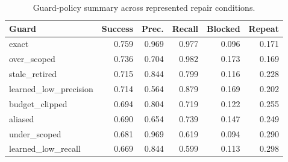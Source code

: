 \begin{table}[t]
\centering
\caption{Guard-policy summary across represented repair conditions.}
\label{tab:guard-summary}
\small
\begin{tabular}{lrrrrr}
\toprule
Guard & Success & Prec. & Recall & Blocked & Repeat \\
\midrule
exact & 0.759 & 0.969 & 0.977 & 0.096 & 0.171 \\
over\_scoped & 0.736 & 0.704 & 0.982 & 0.173 & 0.169 \\
stale\_retired & 0.715 & 0.844 & 0.799 & 0.116 & 0.228 \\
learned\_low\_precision & 0.714 & 0.564 & 0.879 & 0.169 & 0.202 \\
budget\_clipped & 0.694 & 0.804 & 0.719 & 0.122 & 0.255 \\
aliased & 0.690 & 0.654 & 0.739 & 0.147 & 0.249 \\
under\_scoped & 0.681 & 0.969 & 0.619 & 0.094 & 0.290 \\
learned\_low\_recall & 0.669 & 0.844 & 0.599 & 0.113 & 0.298 \\
\bottomrule
\end{tabular}
\end{table}
